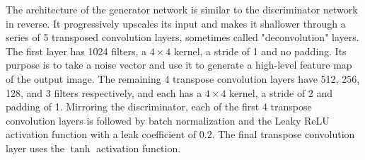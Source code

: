 \documentclass[10pt,twocolumn,letterpaper]{article}
\begin{document}
The architecture of the generator network is similar to the discriminator network in reverse. It progressively upscales its input and makes it shallower through a series of 5 transposed convolution layers, sometimes called "deconvolution" layers. The first layer has 1024 filters, a $ 4 \times 4 $ kernel, a stride of 1 and no padding. Its purpose is to take a noise vector and use it to generate a high-level feature map of the output image. The remaining 4 transpose convolution layers have 512, 256, 128, and 3 filters respectively, and each has a $ 4 \times 4 $ kernel, a stride of 2 and padding of 1. Mirroring the discriminator, each of the first 4 transpose convolution layers is followed by batch normalization and the Leaky ReLU activation function \cite{maas2013rectifier} with a leak coefficient of $ 0.2 $. The final transpose convolution layer uses the $ \tanh $ activation function.
\end{document}
